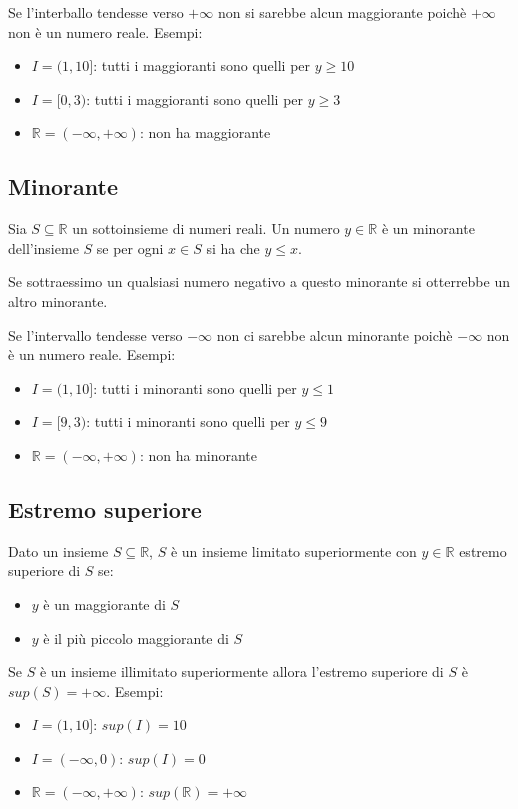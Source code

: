 \documentclass[a4paper]{article}
\theoremstyle{break}
\theoremstyle{break}
\theoremstyle{break}
\theoremstyle{break}
\begin{document}
Se l'interballo tendesse verso \( +\infty \) non si sarebbe alcun maggiorante poichè \( +\infty \) non
è un numero reale. Esempi:
\begin{itemize}
  \item \( I = (1,10] \): tutti i maggioranti sono quelli per \( y \ge 10 \)
  \item \( I = [0,3) \): tutti i maggioranti sono quelli per \( y \ge 3 \)
  \item \( \mathbb{R} = (-\infty,+\infty) \): non ha maggiorante
\end{itemize}


\subsection{Minorante}
\begin{definition}
  Sia \( S \subseteq \mathbb{R}\) un sottoinsieme di numeri reali. Un numero \( y \in \mathbb{R} \)
  è un minorante dell'insieme \( S \) se per ogni \( x \in S \) si ha che \( y \le x \).
\end{definition}
Se sottraessimo un qualsiasi numero negativo a questo minorante si otterrebbe un altro minorante.

Se l'intervallo tendesse verso \( -\infty \) non ci sarebbe alcun minorante poichè \( -\infty \) non
è un numero reale. Esempi:
\begin{itemize}
  \item \( I = (1,10] \): tutti i minoranti sono quelli per \( y \le 1 \)
  \item \( I = [9,3) \): tutti i minoranti sono quelli per \( y \le 9 \)
  \item \( \mathbb{R} = (-\infty,+\infty) \): non ha minorante
\end{itemize}


\subsection{Estremo superiore}
Dato un insieme \( S \subseteq \mathbb{R} \), \( S \) è un insieme limitato superiormente con \( y \in \mathbb{R} \)
estremo superiore di \( S \) se:
\begin{itemize}
  \item \( y \) è un maggiorante di \( S \)
  \item \( y \) è il più piccolo maggiorante di \( S \)
\end{itemize}
Se \( S \) è un insieme illimitato superiormente allora l'estremo superiore di \( S \) è \( sup(S)=+\infty \).
Esempi:
\begin{itemize}
  \item \( I = (1,10] \): \( sup(I) = 10 \)
  \item \( I = (-\infty,0) \): \( sup(I) = 0 \)
  \item \( \mathbb{R} = (-\infty, +\infty) \): \( sup(\mathbb{R}) = +\infty \)
\end{itemize}
\end{document}
